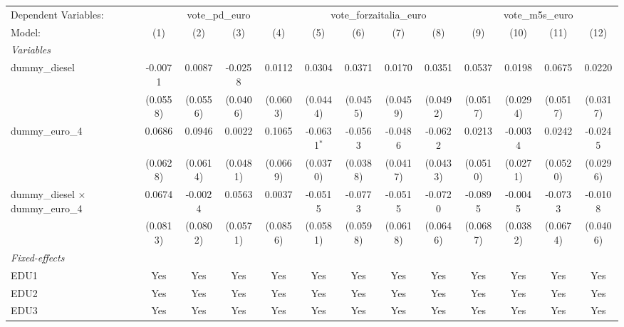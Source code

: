 
\begingroup
\centering
\begin{tabular}{lcccccccccccc}
   \tabularnewline \midrule \midrule
   Dependent Variables: & \multicolumn{4}{c}{vote\_pd\_euro} & \multicolumn{4}{c}{vote\_forzaitalia\_euro} & \multicolumn{4}{c}{vote\_m5s\_euro}\\
   Model:                                    & (1)      & (2)      & (3)      & (4)      & (5)           & (6)      & (7)      & (8)      & (9)      & (10)     & (11)     & (12)\\  
   \midrule
   \emph{Variables}\\
   dummy\_diesel                             & -0.0071  & 0.0087   & -0.0258  & 0.0112   & 0.0304        & 0.0371   & 0.0170   & 0.0351   & 0.0537   & 0.0198   & 0.0675   & 0.0220\\   
                                             & (0.0558) & (0.0556) & (0.0406) & (0.0603) & (0.0444)      & (0.0455) & (0.0459) & (0.0492) & (0.0517) & (0.0294) & (0.0517) & (0.0317)\\   
   dummy\_euro\_4                            & 0.0686   & 0.0946   & 0.0022   & 0.1065   & -0.0631$^{*}$ & -0.0563  & -0.0486  & -0.0622  & 0.0213   & -0.0034  & 0.0242   & -0.0245\\   
                                             & (0.0628) & (0.0614) & (0.0481) & (0.0669) & (0.0370)      & (0.0388) & (0.0417) & (0.0433) & (0.0510) & (0.0271) & (0.0520) & (0.0296)\\   
   dummy\_diesel $\times$ dummy\_euro\_4     & 0.0674   & -0.0024  & 0.0563   & 0.0037   & -0.0515       & -0.0773  & -0.0515  & -0.0720  & -0.0895  & -0.0045  & -0.0733  & -0.0108\\   
                                             & (0.0813) & (0.0802) & (0.0571) & (0.0856) & (0.0581)      & (0.0598) & (0.0618) & (0.0646) & (0.0687) & (0.0382) & (0.0674) & (0.0406)\\   
   \midrule
   \emph{Fixed-effects}\\
   EDU1                                      & Yes      & Yes      & Yes      & Yes      & Yes           & Yes      & Yes      & Yes      & Yes      & Yes      & Yes      & Yes\\  
   EDU2                                      & Yes      & Yes      & Yes      & Yes      & Yes           & Yes      & Yes      & Yes      & Yes      & Yes      & Yes      & Yes\\  
   EDU3                                      & Yes      & Yes      & Yes      & Yes      & Yes           & Yes      & Yes      & Yes      & Yes      & Yes      & Yes      & Yes\\  

\end{tabular}
